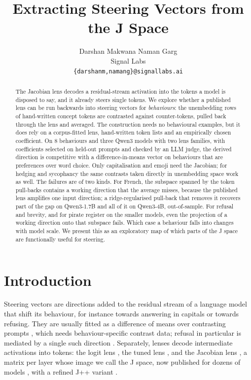 \documentclass{article}
\title{Extracting Steering Vectors from the J Space}
\author{%
  Darshan Makwana \qquad Naman Garg \\
  Signal Labs \\
  \texttt{\{darshanm,namang\}@signallabs.ai} \\
}
\begin{document}
\maketitle

\begin{abstract}
  The Jacobian lens decodes a residual-stream activation into the tokens a model is disposed to say, and it already steers single tokens. We explore whether a published lens can be run backwards into steering vectors for \emph{behaviours}: the unembedding rows of hand-written concept tokens are contrasted against counter-tokens, pulled back through the lens and averaged. The construction needs no behavioural examples, but it does rely on a corpus-fitted lens, hand-written token lists and an empirically chosen coefficient. On 8 behaviours and three Qwen3 models with two lens families, with coefficients selected on held-out prompts and checked by an LLM judge, the derived direction is competitive with a difference-in-means vector on behaviours that are preferences over word choice. Only capitalisation and emoji need the Jacobian; for hedging and sycophancy the same contrasts taken directly in unembedding space work as well. The failures are of two kinds. For French, the subspace spanned by the token pull-backs contains a working direction that the average misses, because the published lens amplifies one input direction; a ridge-regularised pull-back that removes it recovers part of the gap on Qwen3-1.7B and all of it on Qwen3-4B, out-of-sample. For refusal and brevity, and for pirate register on the smaller models, even the projection of a working direction onto that subspace fails. Which case a behaviour falls into changes with model scale. We present this as an exploratory map of which parts of the J space are functionally useful for steering.
\end{abstract}

\section{Introduction}

Steering vectors are directions added to the residual stream of a language model that shift its behaviour, for instance towards answering in capitals or towards refusing. They are usually fitted as a difference of means over contrasting prompts \citep{turner2023actadd,rimsky2024caa,zou2023repe}, which needs behaviour-specific contrast data; refusal in particular is mediated by a single such direction \citep{arditi2024refusal}. Separately, lenses decode intermediate activations into tokens: the logit lens \citep{nostalgebraist2020logitlens}, the tuned lens \citep{belrose2023tuned}, and the Jacobian lens \citep{gurnee2026workspace}, a matrix per layer whose image we call the J space, now published for dozens of models \citep{neuronpedia2026jlens}, with a refined J++ variant \citep{ayonrinde2026jpplens}.
\end{document}
